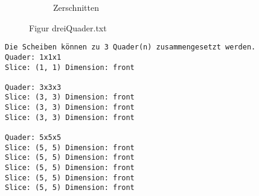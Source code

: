 \documentclass[a4paper,10pt,ngerman]{scrartcl}
\newcommand{\simplecube}[8]%
{
    \begin{scope}[shift={#1}]
        \fill[gray!40,canvas is yz plane at x=#2, opacity=#8] (0,0) rectangle (#3,#4);
        \fill[gray!10,canvas is xz plane at y=#3, opacity=#8] (0,0) rectangle (#2,#4);
        \fill[white  ,canvas is xy plane at z=#4, opacity=#8] (0,0) rectangle (#2,#3);
        \foreach\i/\j in {0/1, 1/1, 1/0}
            {
            \draw[line#5] (0,#3*\i,#4*\j) --++ (#2,0,0);
            \draw[line#6] (#2*\i,0,#4*\j) --++ (0,#3,0);
            \draw[line#7] (#2*\i,#3*\j,0) --++ (0,0,#4);
        }
    \end{scope}
}
\begin{document}
\begin{figure}[H]
\begin{subfigure}[b]{0.45\textwidth}
\begin{tikzpicture}[3d view={115}{30},line cap=round,line join=round,scale=0.4]
            \end{tikzpicture}
            \caption{Zerschnitten}\label{fig:figB4}
        \end{subfigure}
        \caption{Figur dreiQuader.txt}\label{fig:figAB4}
    \end{figure}

    \begin{lstlisting}[frame=single, title=Programmausgabe dreiQuader.txt, breaklines=true,label={lst:lstlisting2}]
Die Scheiben können zu 3 Quader(n) zusammengesetzt werden.
Quader: 1x1x1
Slice: (1, 1) Dimension: front

Quader: 3x3x3
Slice: (3, 3) Dimension: front
Slice: (3, 3) Dimension: front
Slice: (3, 3) Dimension: front

Quader: 5x5x5
Slice: (5, 5) Dimension: front
Slice: (5, 5) Dimension: front
Slice: (5, 5) Dimension: front
Slice: (5, 5) Dimension: front
Slice: (5, 5) Dimension: front
    \end{lstlisting}
\end{document}
